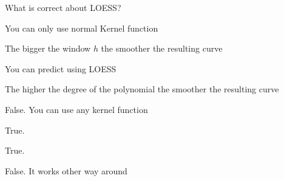 
\begin{question}
What is correct about LOESS?
\begin{answerlist}
  \item You can only use normal Kernel function
  \item The bigger the window \(h\) the smoother the resulting curve
  \item You can predict using LOESS
  \item The higher the degree of the polynomial the smoother the resulting curve
\end{answerlist}
\end{question}

\begin{solution}
\begin{answerlist}
  \item False. You can use any kernel function
  \item True.
  \item True.
  \item False. It works other way around
\end{answerlist}
\end{solution}

